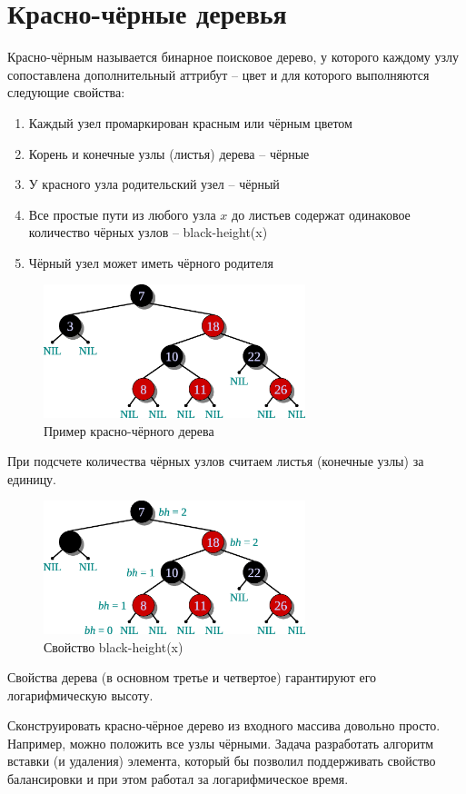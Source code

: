 \documentclass[11pt]{article}
\begin{document}
\section{Красно-чёрные деревья}
Красно-чёрным называется бинарное поисковое дерево, у которого каждому узлу сопоставлена дополнительный аттрибут -- цвет и для которого выполняются следующие свойства:
\begin{enumerate}
\item Каждый узел промаркирован красным или чёрным цветом
\item Корень и конечные узлы (листья) дерева -- чёрные
\item У красного узла родительский узел -- чёрный
\item Все простые пути из любого узла $x$ до листьев содержат одинаковое количество чёрных узлов -- black-height(x)
\item Чёрный узел может иметь чёрного родителя
\end{enumerate}
\begin{figure}[ht]
  \centering
  \includegraphics[width=3in]{lecture10/rbtree.eps}
  \caption{Пример красно-чёрного дерева}
  \label{fig:rbtree}
\end{figure}
При подсчете количества чёрных узлов считаем листья (конечные узлы) за единицу.
\begin{figure}[ht]
  \centering
  \includegraphics[width=3in]{lecture10/bh_rbtree.eps}
  \caption{Свойство black-height(x)}
  \label{fig:bh-rbtree}
\end{figure}
Свойства дерева (в основном третье и четвертое) гарантируют его логарифмическую высоту.

Сконструировать красно-чёрное дерево из входного массива довольно просто. Например, можно положить все узлы чёрными. Задача разработать алгоритм вставки (и удаления) элемента, который бы позволил поддерживать свойство балансировки и при этом работал за логарифмическое время.
\end{document}

